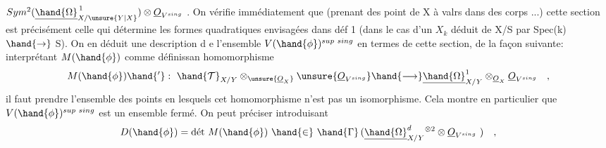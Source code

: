 $Sym^2(\underline{\hand{\Omega}}^{\,1}_{X/\unsure{Y|X}}) \otimes \underline{O}_{V^{sing}}$ . On vérifie immédiatement que (prenant des
point de X à valrs dans des corps ...) cette section est précisément
celle qui détermine les formes quadratiques envisagées dans déf 1
(dans le cas  d'un $X_k$ déduit de X/S par Spec(k)$\hand{\rightarrow}$ S). On
en déduit une description d e l'ensemble $V(\hand{\phi})^{sup\ sing}$ en termes de
cette section, de la façon suivante: interprétant $M(\hand{\phi})$ comme définissan
homomorphisme
\[
M(\hand{\phi})\hand{'} : \ \hand{\mathcal{T}}_{X/Y} \otimes_{\unsure{\underline{O}_X}} \unsure{\underline{O}_{V^{sing}}} \hand{\longrightarrow} \underline{\hand{\Omega}}^1_{X/Y} \otimes_{\underline{O}_X} \underline{O}_{V^{sing}} \quad ,
\]
il faut prendre l'ensemble des points en lesquels cet homomorphisme
n'est pas un isomorphisme. Cela montre en particulier que $V(\hand{\phi})^{sup\ sing}$
est un ensemble fermé. On peut  préciser  introduisant
\[
D(\hand{\phi}) = \text{dét}\ M(\hand{\phi}) \ \hand{\in} \ \hand{\Gamma}\,(\underline{\hand{\Omega}}^d_{X/Y}{}^{\otimes 2} \otimes \underline{O}_{V^{sing}}\ ) \quad ,
\]

